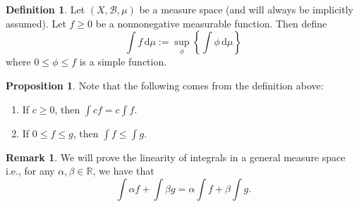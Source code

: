 \documentclass[12pt]{article}
\newcommand{\R}{\mathbb{R}}
\newcommand{\B}{\mathcal{B}}
\newcommand{\dif}{\, \mathrm{d}}
\theoremstyle{definition}
\newtheorem*{definition}{Definition}
\newtheorem*{prop}{Proposition}
\newtheorem*{remark}{Remark}
\begin{document}
\begin{definition}
  
  Let \( (X, \B, \mu) \) be a measure space (and will always be implicitly assumed).  
  Let \( f \geq 0 \) be a nonnonegative measurable function. Then define
    \[
        \int f \dif \mu := \sup_{\phi} \left\{ \int \phi \dif \mu \right\}
    \]
  where \( 0 \leq \phi \leq f \) is a simple function. 
\end{definition}

\begin{prop}

  Note that the following comes from the definition above:
    \begin{enumerate}[label = (\arabic{*})]
      \item If \( c \geq 0 \), then \( \displaystyle \int cf  = c \int f \).
      \item If \( 0 \leq f \leq g \), then \( \displaystyle \int f \leq \int g \).
    \end{enumerate}

\end{prop}

\begin{remark}
    We will prove the linearity of integrals in a general measure space i.e., for any \( \alpha, \beta \in \R \), we have that 
      \[
        \int \alpha f + \int \beta g = \alpha \int f + \beta \int g.
      \]

\end{remark}
\end{document}
